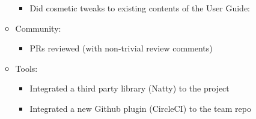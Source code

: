 \documentclass[11pt,british]{article}
\begin{document}
\begin{itemize}
\begin{itemize}
        \begin{itemize}
            \item
            Did cosmetic tweaks to existing contents of the User Guide:
        \end{itemize}
        \item
        Community:

        \begin{itemize}
            \item
            PRs reviewed (with non-trivial review comments)
        \end{itemize}
        \item
        Tools:

        \begin{itemize}
            \item
            Integrated a third party library (Natty) to the project
            \item
            Integrated a new Github plugin (CircleCI) to the team repo
        \end{itemize}
    \end{itemize}
\end{itemize}
\end{document}
